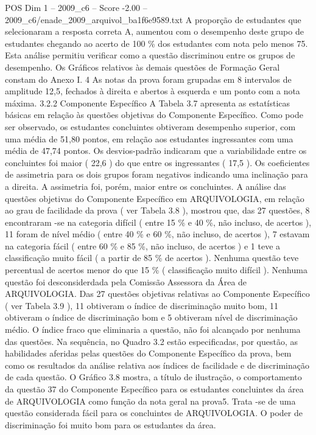 \begin{textsample}{POS Dim 1 – 2009\_c6 – Score -2.00 – 2009\_c6/enade\_2009\_arquivol\_ba1f6e9589.txt}
A proporção de estudantes que selecionaram a resposta correta A, aumentou com o desempenho deste grupo de estudantes chegando ao acerto de 100 \% dos estudantes com nota pelo menos 75.
Esta análise permitiu verificar como a questão discriminou entre os grupos de desempenho.
Os Gráficos relativos às demais questões de Formação Geral constam do Anexo I. 4 As notas da prova foram grupadas em 8 intervalos de amplitude 12,5, fechados à direita e abertos à esquerda e um ponto com a nota máxima. 3.2.2 Componente Específico A Tabela 3.7 apresenta as estatísticas básicas em relação às questões objetivas do Componente Específico.
Como pode ser observado, os estudantes concluintes obtiveram desempenho superior, com uma média de 51,80 pontos, em relação aos estudantes ingressantes com uma média de 47,74 pontos.
Os desvios-padrão indicaram que a variabilidade entre os concluintes foi maior ( 22,6 ) do que entre os ingressantes ( 17,5 ).
Os coeficientes de assimetria para os dois grupos foram negativos indicando uma inclinação para a direita.
A assimetria foi, porém, maior entre os concluintes.
A análise das questões objetivas do Componente Específico em ARQUIVOLOGIA, em relação ao grau de facilidade da prova ( ver Tabela 3.8 ), mostrou que, das 27 questões, 8 encontraram -se na categoria difícil ( entre 15 \% e 40 \%, não incluso, de acertos ), 11 foram de nível médio ( entre 40 \% e 60 \%, não incluso, de acertos ), 7 estavam na categoria fácil ( entre 60 \% e 85 \%, não incluso, de acertos ) e 1 teve a classificação muito fácil ( a partir de 85 \% de acertos ).
Nenhuma questão teve percentual de acertos menor do que 15 \% ( classificação muito difícil ).
Nenhuma questão foi desconsiderdada pela Comissão Assessora da Área de ARQUIVOLOGIA.
Das 27 questões objetivas relativas ao Componente Específico ( ver Tabela 3.9 ), 11 obtiveram o índice de discriminação muito bom, 11 obtiveram o índice de discriminação bom e 5 obtiveram nível de discriminação médio.
O índice fraco que eliminaria a questão, não foi alcançado por nenhuma das questões.
Na sequência, no Quadro 3.2 estão especificadas, por questão, as habilidades aferidas pelas questões do Componente Específico da prova, bem como os resultados da análise relativa aos índices de facilidade e de discriminação de cada questão.
O Gráfico 3.8 mostra, a título de ilustração, o comportamento da questão 37 do Componente Específico para os estudantes concluintes da área de ARQUIVOLOGIA como função da nota geral na prova5.
Trata -se de uma questão considerada fácil para os concluintes de ARQUIVOLOGIA.
O poder de discriminação foi muito bom para os estudantes da área.

\end{textsample}
